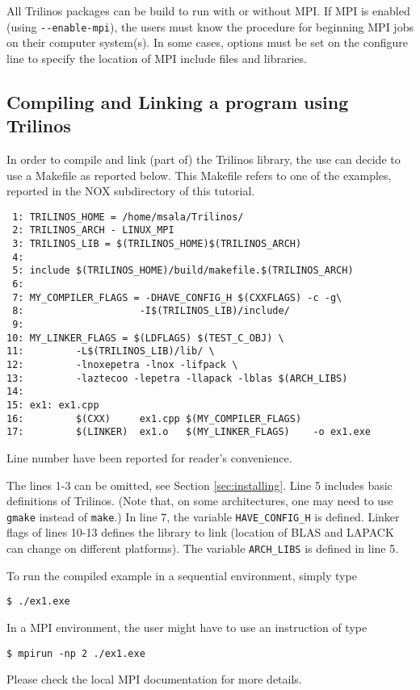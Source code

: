\begin{remark}
  All Trilinos packages can be build to run with or without MPI. If MPI
  is enabled (using \verb!--enable-mpi!), the users must know the
  procedure for beginning MPI jobs on their computer system(s). In some
  cases, options must be set on the configure line to specify the
  location of MPI include files and libraries.
\end{remark}


\subsection{Compiling and Linking a program using Trilinos}
\label{sec:intro_compiling}

In order to compile and link (part of) the Trilinos library, the use can
decide to use a Makefile as reported below. This Makefile refers to one
of the examples, reported in the NOX subdirectory of this tutorial.
\begin{verbatim}
 1: TRILINOS_HOME = /home/msala/Trilinos/
 2: TRILINOS_ARCH - LINUX_MPI
 3: TRILINOS_LIB = $(TRILINOS_HOME)$(TRILINOS_ARCH)
 4: 
 5: include $(TRILINOS_HOME)/build/makefile.$(TRILINOS_ARCH)
 6: 
 7: MY_COMPILER_FLAGS = -DHAVE_CONFIG_H $(CXXFLAGS) -c -g\
 8:                    -I$(TRILINOS_LIB)/include/
 9:
10: MY_LINKER_FLAGS = $(LDFLAGS) $(TEST_C_OBJ) \
11:         -L$(TRILINOS_LIB)/lib/ \
12:         -lnoxepetra -lnox -lifpack \
13:         -laztecoo -lepetra -llapack -lblas $(ARCH_LIBS)
14:
15: ex1: ex1.cpp
16:         $(CXX)     ex1.cpp $(MY_COMPILER_FLAGS)
17:         $(LINKER)  ex1.o   $(MY_LINKER_FLAGS)    -o ex1.exe
\end{verbatim}

Line number have been reported for  reader's convenience. 

The lines 1-3 can be omitted, see Section \ref{sec:installing}.  Line 5
includes basic definitions of Trilinos. (Note that, on some
architectures, one may need to use \verb!gmake! instead of \verb!make!.)
In line 7, the variable \verb!HAVE_CONFIG_H! is defined. Linker flags of
lines 10-13 defines the library to link (location of BLAS and LAPACK can
change on different platforms). The variable \verb!ARCH_LIBS! is defined
in line 5.

To run the compiled example in a sequential environment, simply type
\begin{verbatim}
$ ./ex1.exe
\end{verbatim}
In a MPI environment, the user might have to
use an instruction of type
\begin{verbatim}
$ mpirun -np 2 ./ex1.exe
\end{verbatim}
Please check the local MPI documentation for more details. 


